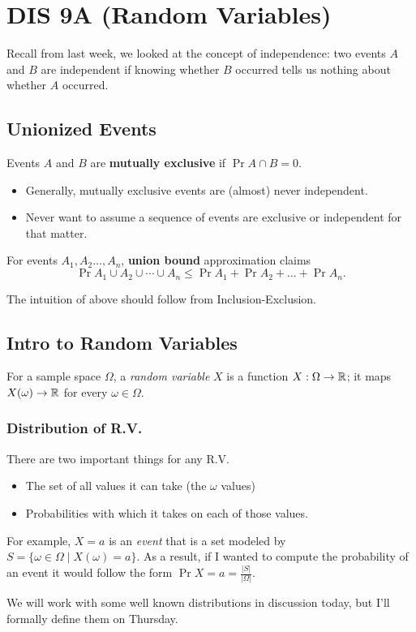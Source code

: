 \section{DIS 9A (Random Variables)}

Recall from last week, we looked at the concept of independence: two events $A$ and $B$ are independent if knowing whether $B$ occurred tells us nothing about whether $A$ occurred. 

\subsection{Unionized Events}
\begin{definition}
    Events $A$ and $B$ are \textbf{mutually exclusive} if $\Pr{A \cap B} = 0$. 
\end{definition}

\begin{itemize}
    \item Generally, mutually exclusive events are (almost) never independent.
    \item Never want to assume a sequence of events are exclusive or independent for that matter. 
\end{itemize}

\begin{definition}
    For events $A_1, A_2 \ldots, A_n$, \textbf{union bound} approximation claims \[ \Pr{A_1 \cup A_2 \cup \cdots \cup A_n} \le \Pr{A_1} + \Pr{A_2} + \ldots + \Pr{A_n}. \]
\end{definition}
The intuition of above should follow from Inclusion-Exclusion. 

\subsection{Intro to Random Variables}
For a sample space $\Omega$, a \textit{random variable} $X$ is a function $X: \Omega \to \operatorname{\mathbb{R}}$; it maps $X(\omega) \to \operatorname{\mathbb{R}}$ for every $\omega \in \Omega$. 

\subsubsection{Distribution of R.V.}
There are two important things for any R.V. 
\begin{itemize}
    \item The set of all values it can take (the $\omega$ values)
    \item Probabilities with which it takes on each of those values. 
\end{itemize}

For example, $X = a$ is an \textit{event} that is a set modeled by $S = \{\omega \in \Omega \mid X(\omega) = a\}$. As a result, if I wanted to compute the probability of an event it would follow the form $\Pr{X = a} = \frac{|S|}{|\Omega|}$.  


We will work with some well known distributions in discussion today, but I'll formally define them on Thursday. 